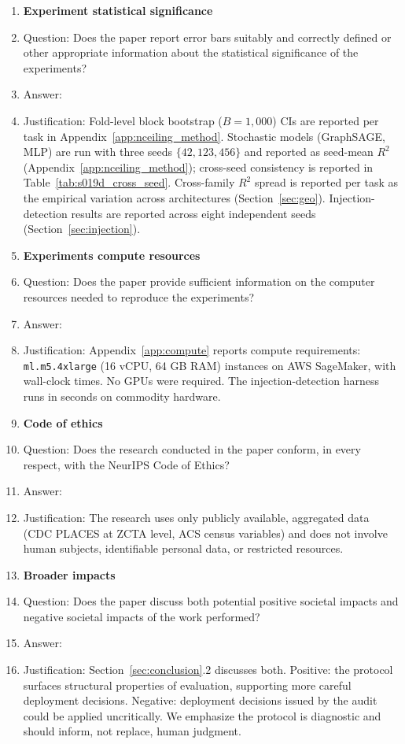 \documentclass{article}
\begin{document}
\begin{enumerate}
\item {\bf Experiment statistical significance}
    \item[] Question: Does the paper report error bars suitably and correctly defined or other appropriate information about the statistical significance of the experiments?
    \item[] Answer: \answerYes{}
    \item[] Justification: Fold-level block bootstrap ($B{=}1{,}000$) CIs are reported per task in Appendix~\ref{app:nceiling_method}. Stochastic models (GraphSAGE, MLP) are run with three seeds $\{42, 123, 456\}$ and reported as seed-mean $R^2$ (Appendix~\ref{app:nceiling_method}); cross-seed consistency is reported in Table~\ref{tab:s019d_cross_seed}. Cross-family $R^2$ spread is reported per task as the empirical variation across architectures (Section~\ref{sec:geo}). Injection-detection results are reported across eight independent seeds (Section~\ref{sec:injection}).

\item {\bf Experiments compute resources}
    \item[] Question: Does the paper provide sufficient information on the computer resources needed to reproduce the experiments?
    \item[] Answer: \answerYes{}
    \item[] Justification: Appendix~\ref{app:compute} reports compute requirements: \texttt{ml.m5.4xlarge} (16 vCPU, 64 GB RAM) instances on AWS SageMaker, with wall-clock times. No GPUs were required. The injection-detection harness runs in seconds on commodity hardware.

\item {\bf Code of ethics}
    \item[] Question: Does the research conducted in the paper conform, in every respect, with the NeurIPS Code of Ethics?
    \item[] Answer: \answerYes{}
    \item[] Justification: The research uses only publicly available, aggregated data (CDC PLACES at ZCTA level, ACS census variables) and does not involve human subjects, identifiable personal data, or restricted resources.

\item {\bf Broader impacts}
    \item[] Question: Does the paper discuss both potential positive societal impacts and negative societal impacts of the work performed?
    \item[] Answer: \answerYes{}
    \item[] Justification: Section~\ref{sec:conclusion}.2 discusses both. Positive: the protocol surfaces structural properties of evaluation, supporting more careful deployment decisions. Negative: deployment decisions issued by the audit could be applied uncritically. We emphasize the protocol is diagnostic and should inform, not replace, human judgment.


\end{enumerate}
\end{document}
